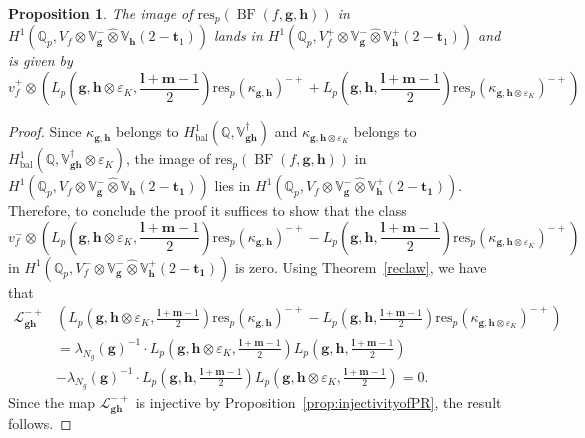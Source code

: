 \documentclass[a4paper,11pt]{amsart}
\theoremstyle{plain}
\newtheorem{proposition}[theorem]{Proposition}
\theoremstyle{definition}
\theoremstyle{remark}
\newcommand{\bb}{\mathbb}
\newcommand{\cl}{\mathcal}
\DeclareMathOperator{\BF}{BF}
\DeclareMathOperator{\bal}{bal}
\newcommand{\hg}{{\mathbf{g}}}
\newcommand{\hh}{{\mathbf h}}
\newcommand{\res}{\mathrm{res}}
\numberwithin{equation}{section}
\begin{document}
\begin{proposition}\label{prop:localconditionforBF}
    The image of $\res_p(\BF(f, \hg, \hh))$ in $H^1(\bb{Q}_p, V_f \otimes \bb{V}_{\hg}^- \hat{\otimes} \bb{V}_{\hh}(2-\mathbf{t}_1))$ lands in $H^1(\bb{Q}_p,V_f^+\otimes \bb{V}_\hg^- \hat{\otimes} \bb{V}_\hh^+(2-\mathbf{t}_1))$ and is given by
    \[
    v_f^+\otimes \left(L_p\left(\hg,\hh\otimes\varepsilon_K,\frac{\mathbf{l}+\mathbf{m}-1}{2}\right)\res_p(\kappa_{\hg,\hh})^{-+}+L_p\left(\hg,\hh,\frac{\mathbf{l}+\mathbf{m}-1}{2}\right)\res_p(\kappa_{\hg,\hh\otimes\varepsilon_K})^{-+}\right)
    \]
\end{proposition}
\begin{proof}
    Since $\kappa_{\hg,\hh}$ belongs to $H^1_{\bal}(\bb{Q},\bb{V}_{\hg\hh}^\dagger)$ and $\kappa_{\hg,\hh\otimes\varepsilon_K}$ belongs to $H^1_{\bal}(\bb{Q},\bb{V}_{\hg\hh}^\dagger\otimes\varepsilon_K)$, the image of $\res_p(\BF(f, \hg, \hh))$ in $H^1(\bb{Q}_p, V_f \otimes \bb{V}_{\hg}^- \hat{\otimes} \bb{V}_{\hh}(2-\mathbf{t_1}))$ lies in $H^1(\bb{Q}_p, V_f \otimes \bb{V}_{\hg}^- \hat{\otimes} \bb{V}_{\hh}^+(2-\mathbf{t_1}))$. Therefore, to conclude the proof it suffices to show that the class
    \[
    v_f^-\otimes \left(L_p\left(\hg,\hh\otimes\varepsilon_K,\frac{\mathbf{l}+\mathbf{m}-1}{2}\right)\res_p(\kappa_{\hg,\hh})^{-+}-L_p\left(\hg,\hh,\frac{\mathbf{l}+\mathbf{m}-1}{2}\right)\res_p(\kappa_{\hg,\hh\otimes\varepsilon_K})^{-+}\right)
    \]
    in $H^1(\bb{Q}_p, V_f^- \otimes \bb{V}_{\hg}^- \hat{\otimes} \bb{V}_{\hh}^+(2-\mathbf{t_1}))$ is zero. Using Theorem~\ref{reclaw}, we have that
    \begin{align*}
        \mathcal{L}_{\hg \hh}^{-+} &\left(L_p\left(\hg,\hh\otimes\varepsilon_K,\frac{\mathbf{l}+\mathbf{m}-1}{2}\right)\res_p(\kappa_{\hg,\hh})^{-+}-L_p\left(\hg,\hh,\frac{\mathbf{l}+\mathbf{m}-1}{2}\right)\res_p(\kappa_{\hg,\hh\otimes\varepsilon_K})^{-+}\right) \\
        &= \lambda_{N_g}(\hg)^{-1}\cdot L_p\left(\hg,\hh\otimes\varepsilon_K,\frac{\mathbf{l}+\mathbf{m}-1}{2}\right)L_p\left(\hg,\hh,\frac{\mathbf{l}+\mathbf{m}-1}{2}\right) \\ &-\lambda_{N_g}(\hg)^{-1}\cdot L_p\left(\hg,\hh,\frac{\mathbf{l}+\mathbf{m}-1}{2}\right)L_p\left(\hg,\hh\otimes\varepsilon_K,\frac{\mathbf{l}+\mathbf{m}-1}{2}\right)=0.
    \end{align*}
    Since the map $\cl{L}_{\hg \hh}^{-+}$ is injective by Proposition~\ref{prop:injectivityofPR}, the result follows.
\end{proof}
\end{document}
